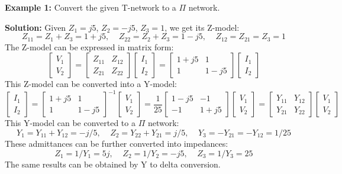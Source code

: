 {\bf Example 1:} Convert the given T-network to a $\Pi$ network.


{\bf Solution:} Given $Z_1=j5$, $Z_2=-j5$, $Z_3=1$, we get its Z-model:
\[  Z_{11}=Z_1+Z_3=1+j5,\;\;\;\;Z_{22}=Z_2+Z_3=1-j5,\;\;\;\;Z_{12}=Z_{21}=Z_3=1 \]
The Z-model can be expressed in matrix form:
\[	\left[ \begin{array}{l} V_1 \\ V_2\end{array} \right]=
	\left[ \begin{array}{cc} Z_{11} & Z_{12} \\ Z_{21} & Z_{22} \end{array} \right]
	\left[ \begin{array}{l} I_1 \\ I_2\end{array} \right]
=	\left[ \begin{array}{cc} 1+j5 & 1 \\ 1 & 1-j5 \end{array} \right]
	\left[ \begin{array}{l} I_1 \\ I_2\end{array} \right]
\]
This Z-model can be converted into a Y-model:
\[	\left[ \begin{array}{l} I_1 \\ I_2\end{array} \right]=
	\left[ \begin{array}{cc} 1+j5 & 1 \\ 1 & 1-j5 \end{array} \right]^{-1}
	\left[ \begin{array}{l} V_1 \\ V_2\end{array} \right]
=\frac{1}{25}
	\left[ \begin{array}{cc} 1-j5 & -1 \\ -1 & 1+j5 \end{array} \right]
	\left[ \begin{array}{l} V_1 \\ V_2\end{array} \right]
=	\left[ \begin{array}{cc} Y_{11} & Y_{12} \\ Y_{21} & Y_{22} \end{array} \right]
	\left[ \begin{array}{l} V_1 \\ V_2\end{array} \right]
\]
This Y-model can be converted to a $\Pi$ network:
\[ Y_1=Y_{11}+Y_{12}=-j/5,\;\;\;\;Z_2=Y_{22}+Y_{21}=j/5,\;\;\;\;
	Y_3=-Y_{21}=-Y_{12}=1/25 \]
These admittances can be further converted into impedances:
\[ Z_1=1/Y_1=5j,\;\;\;\;Z_2=1/Y_2=-j5,\;\;\;\;Z_3=1/Y_3=25	\]
The same results can be obtained by Y to delta conversion.


